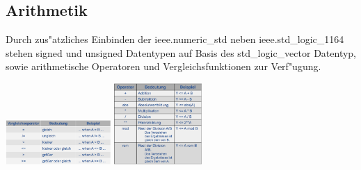 	\subsection{Arithmetik}
		\begin{multicols}{2}
		Durch zus"atzliches Einbinden der ieee.numeric\_std neben ieee.std\_logic\_1164  	
		stehen signed und unsigned Datentypen auf Basis des std\_logic\_vector Datentyp, 
		sowie arithmetische Operatoren und Vergleichsfunktionen zur Verf"ugung.
		\begin{center}
			\includegraphics[width=0.3\textwidth]{pics/arithvergleich}
			\includegraphics[width=0.25\textwidth]{pics/arithoperator}
		\end{center}
	\end{multicols}


